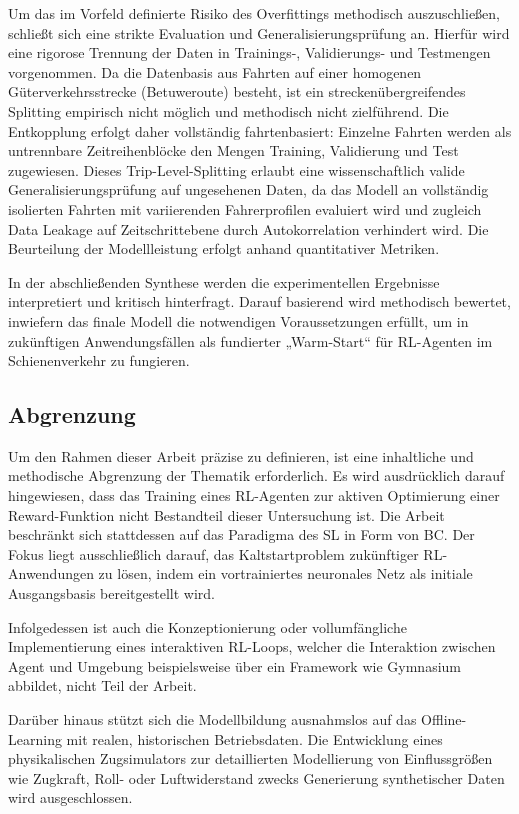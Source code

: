 Um das im Vorfeld definierte Risiko des Overfittings methodisch auszuschließen, schließt sich eine strikte Evaluation und Generalisierungsprüfung an. 
Hierfür wird eine rigorose Trennung der Daten in Trainings-, Validierungs- und Testmengen vorgenommen. 
Da die Datenbasis aus Fahrten auf einer homogenen Güterverkehrsstrecke (Betuweroute) besteht, ist ein streckenübergreifendes Splitting empirisch nicht möglich und methodisch nicht zielführend. 
Die Entkopplung erfolgt daher vollständig fahrtenbasiert: Einzelne Fahrten werden als untrennbare Zeitreihenblöcke den Mengen Training, Validierung und Test zugewiesen. 
Dieses Trip-Level-Splitting erlaubt eine wissenschaftlich valide Generalisierungsprüfung auf ungesehenen Daten, da das Modell an vollständig isolierten Fahrten mit variierenden Fahrerprofilen evaluiert wird und zugleich Data Leakage auf Zeitschrittebene durch Autokorrelation verhindert wird. 
Die Beurteilung der Modellleistung erfolgt anhand quantitativer Metriken.

In der abschließenden Synthese werden die experimentellen Ergebnisse interpretiert und kritisch hinterfragt. 
Darauf basierend wird methodisch bewertet, inwiefern das finale Modell die notwendigen Voraussetzungen erfüllt, um in zukünftigen Anwendungsfällen als fundierter „Warm-Start“ für \gls{RL}-Agenten im Schienenverkehr zu fungieren.

\subsection{Abgrenzung}
\label{sec:abgrenzung}

Um den Rahmen dieser Arbeit präzise zu definieren, ist eine inhaltliche und methodische Abgrenzung der Thematik erforderlich. 
Es wird ausdrücklich darauf hingewiesen, dass das Training eines \gls{RL}-Agenten zur aktiven Optimierung einer Reward-Funktion nicht Bestandteil dieser Untersuchung ist. 
Die Arbeit beschränkt sich stattdessen auf das Paradigma des \gls{SL} in Form von \gls{BC}. 
Der Fokus liegt ausschließlich darauf, das Kaltstartproblem zukünftiger \gls{RL}-Anwendungen zu lösen, indem ein vortrainiertes neuronales Netz als initiale Ausgangsbasis bereitgestellt wird.

Infolgedessen ist auch die Konzeptionierung oder vollumfängliche Implementierung eines interaktiven \gls{RL}-Loops, welcher die Interaktion zwischen Agent und Umgebung beispielsweise über ein Framework wie Gymnasium abbildet, nicht Teil der Arbeit. 

Darüber hinaus stützt sich die Modellbildung ausnahmslos auf das Offline-Learning mit realen, historischen Betriebsdaten. 
Die Entwicklung eines physikalischen Zugsimulators zur detaillierten Modellierung von Einflussgrößen wie Zugkraft, Roll- oder Luftwiderstand zwecks Generierung synthetischer Daten wird ausgeschlossen.

